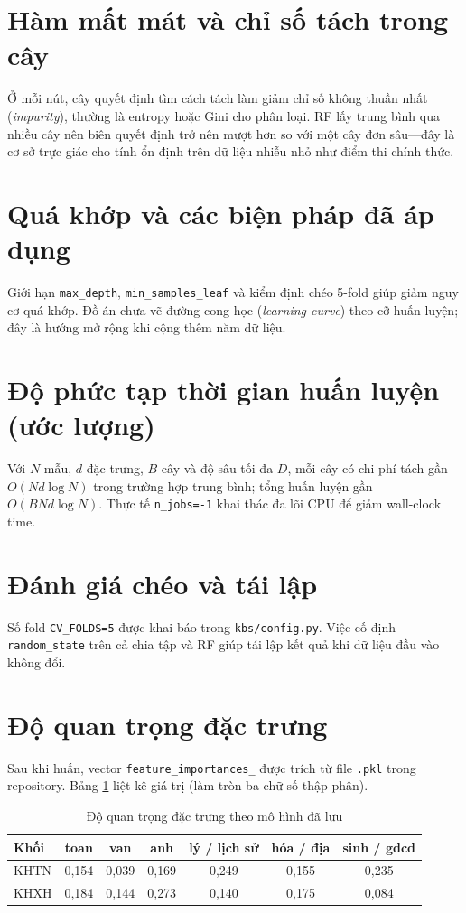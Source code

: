 \section{Hàm mất mát và chỉ số tách trong cây}
Ở mỗi nút, cây quyết định tìm cách tách làm giảm chỉ số không thuần nhất (\textit{impurity}), thường là entropy hoặc Gini cho phân loại. RF lấy trung bình qua nhiều cây nên biên quyết định trở nên mượt hơn so với một cây đơn sâu---đây là cơ sở trực giác cho tính ổn định trên dữ liệu nhiễu nhỏ như điểm thi chính thức.

\section{Quá khớp và các biện pháp đã áp dụng}
Giới hạn \texttt{max\_depth}, \texttt{min\_samples\_leaf} và kiểm định chéo 5-fold giúp giảm nguy cơ quá khớp. Đồ án chưa vẽ đường cong học (\textit{learning curve}) theo cỡ huấn luyện; đây là hướng mở rộng khi cộng thêm năm dữ liệu.

\section{Độ phức tạp thời gian huấn luyện (ước lượng)}
Với $N$ mẫu, $d$ đặc trưng, $B$ cây và độ sâu tối đa $D$, mỗi cây có chi phí tách gần $O(N d \log N)$ trong trường hợp trung bình; tổng huấn luyện gần $O(B N d \log N)$. Thực tế \texttt{n\_jobs=-1} khai thác đa lõi CPU để giảm wall-clock time.

\section{Đánh giá chéo và tái lập}
Số fold \texttt{CV\_FOLDS=5} được khai báo trong \texttt{kbs/config.py}. Việc cố định \texttt{random\_state} trên cả chia tập và RF giúp tái lập kết quả khi dữ liệu đầu vào không đổi.

\section{Độ quan trọng đặc trưng }
Sau khi huấn, vector \texttt{feature\_importances\_} được trích từ file \texttt{.pkl} trong repository. Bảng \ref{tab:fi} liệt kê giá trị (làm tròn ba chữ số thập phân).

\begin{table}[htbp]
\centering
\caption{Độ quan trọng đặc trưng theo mô hình đã lưu}
\label{tab:fi}
\begin{tabular}{lcccccc}
\toprule
Khối & toan & van & anh & lý / lịch sử & hóa / địa & sinh / gdcd \\
\midrule
KHTN & 0{,}154 & 0{,}039 & 0{,}169 & 0{,}249 & 0{,}155 & 0{,}235 \\
KHXH & 0{,}184 & 0{,}144 & 0{,}273 & 0{,}140 & 0{,}175 & 0{,}084 \\
\bottomrule
\end{tabular}
\end{table}

